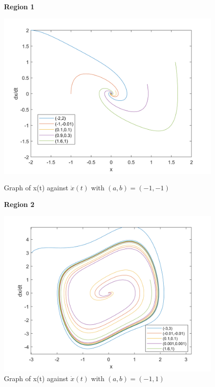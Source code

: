 \documentclass[10pt]{article}
\begin{document}
\begin{figure}[H]
    \begin{minipage}[b]{0.5\linewidth}
            \centering
            \textbf{Region 1}\par
            \includegraphics[width=\textwidth]{Files/q6,region1.png}
            \caption{Graph of x(t) against $\dot{x}(t)$ with $(a,b)=(-1,-1)$}
        \end{minipage}
        \hfill
        \begin{minipage}[b]{0.5\linewidth}
            \centering
            \textbf{Region 2}\par
            \includegraphics[width=\textwidth]{Files/q6,region2.png}
            \caption{Graph of x(t) against $\dot{x}(t)$ with $(a,b)=(-1,1)$}
        \end{minipage}
\end{figure}
\end{document}
